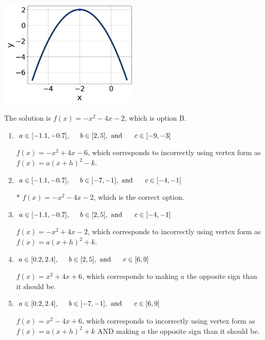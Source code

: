 \documentclass{extbook}[14pt]
\begin{document}
\begin{enumerate}
{\begin{center}
    \includegraphics[width=0.5\textwidth]{../Figures/quadraticGraphToEquationC.png}
\end{center}


The solution is \( f(x) = -x^{2} -4 x -2 \), which is option B.\begin{enumerate}[label=\Alph*.]
\item \( a \in [-1.1, -0.7], \hspace*{5mm} b \in [2, 5], \text{ and } \hspace*{5mm} c \in [-9, -3] \)

$f(x)=-x^{2} +4 x -6$, which corresponds to incorrectly using vertex form as $f(x) = a(x+h)^2 - k$.
\item \( a \in [-1.1, -0.7], \hspace*{5mm} b \in [-7, -1], \text{ and } \hspace*{5mm} c \in [-4, -1] \)

* $f(x)=-x^{2} -4 x -2$, which is the correct option.
\item \( a \in [-1.1, -0.7], \hspace*{5mm} b \in [2, 5], \text{ and } \hspace*{5mm} c \in [-4, -1] \)

$f(x)=-x^{2} +4 x -2$, which corresponds to incorrectly using vertex form as $f(x) = a(x+h)^2+k$.
\item \( a \in [0.2, 2.4], \hspace*{5mm} b \in [2, 5], \text{ and } \hspace*{5mm} c \in [6, 9] \)

$f(x)=x^{2} +4 x + 6$, which corresponds to making $a$ the opposite sign than it should be.
\item \( a \in [0.2, 2.4], \hspace*{5mm} b \in [-7, -1], \text{ and } \hspace*{5mm} c \in [6, 9] \)

$f(x)=x^{2} -4 x + 6$, which corresponds to incorrectly using vertex form as $f(x) = a(x+h)^2+k$ AND making $a$ the opposite sign than it should be.
\end{enumerate}

}
\end{enumerate}
\end{document}
